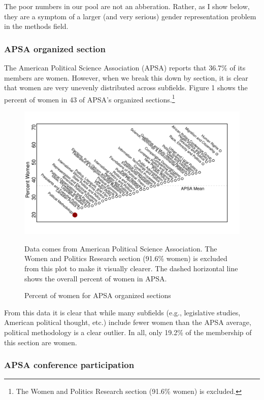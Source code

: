 \documentclass[12pt]{texMemo}
\begin{document}
The poor numbers in our pool are not an abberation.  Rather, as I show below, they are a symptom of a larger (and very serious) gender representation problem in the methods field.  


\subsubsection*{APSA organized section}

The American Political Science Association (APSA) reports that 36.7\% of its members are women.  However, when we break this down by section, it is clear that women are very unevenly distributed across subfields.  Figure 1 shows the percent of women in 43 of APSA's organized sections.\footnote{The Women and Politics Research section (91.6\% women) is excluded.} 
\begin{figure}[htbp]
\caption{Percent of women for APSA organized sections}
\vspace{-.7in}
\begin{center}
\includegraphics{sections}
\end{center}

\vspace{-1cm}
\footnotesize Data comes from American Political Science Association.  The Women and Politics Research section (91.6\% women) is excluded from this plot to make it visually clearer. The dashed horizontal line shows the overall percent of women in APSA. 
\end{figure}
From this data it is clear that while many subfields (e.g., legislative studies, American political thought, etc.) include fewer women than the APSA average, political methodology is a clear outlier.  In all, only 19.2\% of the membership of this section are women.

\subsubsection*{APSA conference participation}
\end{document}
